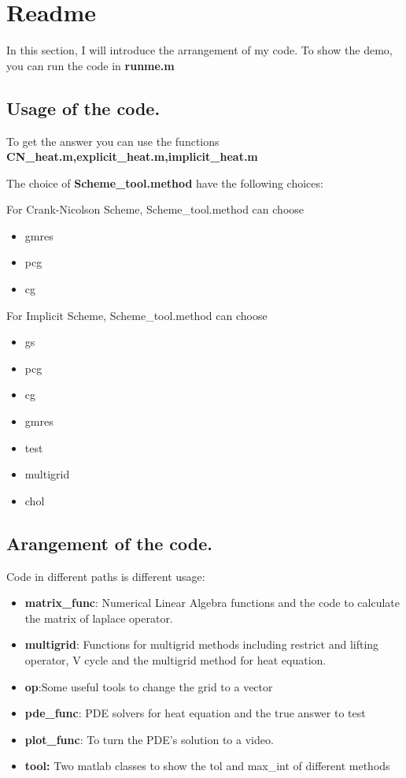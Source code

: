 \documentclass[12pt]{amsart}
\begin{document}
\section{Readme}

In this section, I will introduce the arrangement of my code. To show the demo, you can run the code in \textbf{runme.m}

\subsection{Usage of the code.\\}

To get the answer you can use the functions \textbf{CN\_heat.m,explicit\_heat.m,implicit\_heat.m}

The choice of \textbf{Scheme\_tool.method} have the following choices:

For Crank-Nicolson Scheme, Scheme\_tool.method can choose

\begin{itemize}
\item gmres
\item pcg
\item cg
\end{itemize}



For Implicit Scheme, Scheme\_tool.method can choose

\begin{itemize}
\item gs
\item pcg
\item cg
\item gmres
\item test
\item multigrid
\item chol
\end{itemize}

\subsection{Arangement of the code.\\}

Code in different paths is different usage:
\begin{itemize}
\item \textbf{matrix\_func}: Numerical Linear Algebra functions and the code to calculate the matrix of laplace operator.
\item \textbf{multigrid}: Functions for multigrid methods including restrict and lifting operator, V cycle and the multigrid method for heat equation.
\item \textbf{op}:Some useful tools to change the grid to a vector
\item \textbf{pde\_func}: PDE solvers for heat equation and the true answer to test
\item \textbf{plot\_func}: To turn the PDE's solution to a video.
\item \textbf{tool:} Two matlab classes to show the tol and max\_int of different methods 
\end{itemize}
\end{document}
